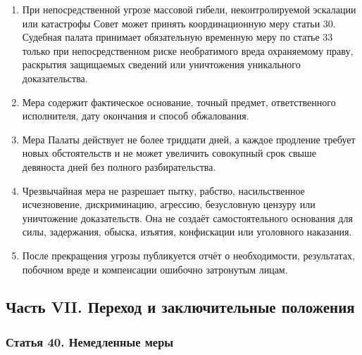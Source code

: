 \documentclass[
  russian,
  11pt,
  a4paper,
]{article}
\providecommand{\tightlist}{%
  \setlength{\itemsep}{0pt}\setlength{\parskip}{0pt}}
\begin{document}
\begin{enumerate}
\def\labelenumi{\arabic{enumi}.}
\tightlist
\item
  При непосредственной угрозе массовой гибели, неконтролируемой
  эскалации или катастрофы Совет может принять координационную меру
  статьи 30. Судебная палата принимает обязательную временную меру по
  статье 33 только при непосредственном риске необратимого вреда
  охраняемому праву, раскрытия защищаемых сведений или уничтожения
  уникального доказательства.
\item
  Мера содержит фактическое основание, точный предмет, ответственного
  исполнителя, дату окончания и способ обжалования.
\item
  Мера Палаты действует не более тридцати дней, а каждое продление
  требует новых обстоятельств и не может увеличить совокупный срок свыше
  девяноста дней без полного разбирательства.
\item
  Чрезвычайная мера не разрешает пытку, рабство, насильственное
  исчезновение, дискриминацию, агрессию, безусловную цензуру или
  уничтожение доказательств. Она не создаёт самостоятельного основания
  для силы, задержания, обыска, изъятия, конфискации или уголовного
  наказания.
\item
  После прекращения угрозы публикуется отчёт о необходимости,
  результатах, побочном вреде и компенсации ошибочно затронутым лицам.
\end{enumerate}

\subsection{Часть VII. Переход и заключительные
положения}\label{ux447ux430ux441ux442ux44c-vii-ux43fux435ux440ux435ux445ux43eux434-ux438-ux437ux430ux43aux43bux44eux447ux438ux442ux435ux43bux44cux43dux44bux435-ux43fux43eux43bux43eux436ux435ux43dux438ux44f}

\subsubsection{Статья 40. Немедленные
меры}\label{ux441ux442ux430ux442ux44cux44f-40-ux43dux435ux43cux435ux434ux43bux435ux43dux43dux44bux435-ux43cux435ux440ux44b}
\end{document}

